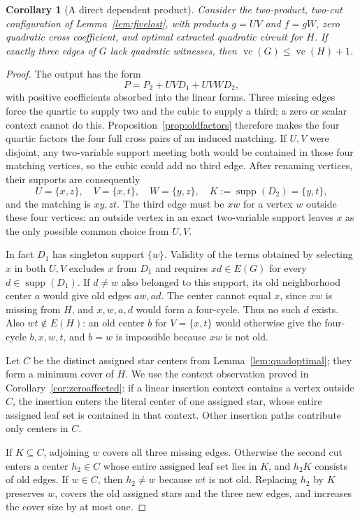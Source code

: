 \documentclass[11pt]{article}
\newcommand{\supp}{\operatorname{supp}}
\newcommand{\vc}{\operatorname{vc}}
\newtheorem{corollary}[theorem]{Corollary}
\theoremstyle{definition}
\theoremstyle{remark}
\begin{document}
\begin{corollary}[A direct dependent product]\label{cor:directproduct}
Consider the two-product, two-cut configuration of Lemma~\ref{lem:fivelost}, with products $g=UV$ and $f=gW$, zero quadratic cross coefficient, and optimal extracted quadratic circuit for $H$. If exactly three edges of $G$ lack quadratic witnesses, then $\vc(G)\le\vc(H)+1$.
\end{corollary}
\begin{proof}
The output has the form
\[
 P=P_2+UVD_1+UVWD_2,
\]
with positive coefficients absorbed into the linear forms. Three missing edges force the quartic to supply two and the cubic to supply a third; a zero or scalar context cannot do this. Proposition~\ref{prop:oldfactors} therefore makes the four quartic factors the four full cross pairs of an induced matching. If $U,V$ were disjoint, any two-variable support meeting both would be contained in those four matching vertices, so the cubic could add no third edge. After renaming vertices, their supports are consequently
\[
 U=\{x,z\},\quad V=\{x,t\},\quad
 W=\{y,z\},\quad K:=\supp(D_2)=\{y,t\},
\]
and the matching is $xy,zt$. The third edge must be $xw$ for a vertex $w$ outside these four vertices: an outside vertex in an exact two-variable support leaves $x$ as the only possible common choice from $U,V$.

In fact $D_1$ has singleton support $\{w\}$. Validity of the terms obtained by selecting $x$ in both $U,V$ excludes $x$ from $D_1$ and requires $xd\in E(G)$ for every $d\in\supp(D_1)$. If $d\ne w$ also belonged to this support, its old neighborhood center $a$ would give old edges $aw,ad$. The center cannot equal $x$, since $xw$ is missing from $H$, and $x,w,a,d$ would form a four-cycle. Thus no such $d$ exists. Also $wt\notin E(H)$: an old center $b$ for $V=\{x,t\}$ would otherwise give the four-cycle $b,x,w,t$, and $b=w$ is impossible because $xw$ is not old.

Let $C$ be the distinct assigned star centers from Lemma~\ref{lem:quadoptimal}; they form a minimum cover of $H$. We use the context observation proved in Corollary~\ref{cor:zeroaffected}: if a linear insertion context contains a vertex outside $C$, the insertion enters the literal center of one assigned star, whose entire assigned leaf set is contained in that context. Other insertion paths contribute only centers in $C$.

If $K\subseteq C$, adjoining $w$ covers all three missing edges. Otherwise the second cut enters a center $h_2\in C$ whose entire assigned leaf set lies in $K$, and $h_2K$ consists of old edges. If $w\in C$, then $h_2\ne w$ because $wt$ is not old. Replacing $h_2$ by $K$ preserves $w$, covers the old assigned stars and the three new edges, and increases the cover size by at most one.


\end{proof}
\end{document}
